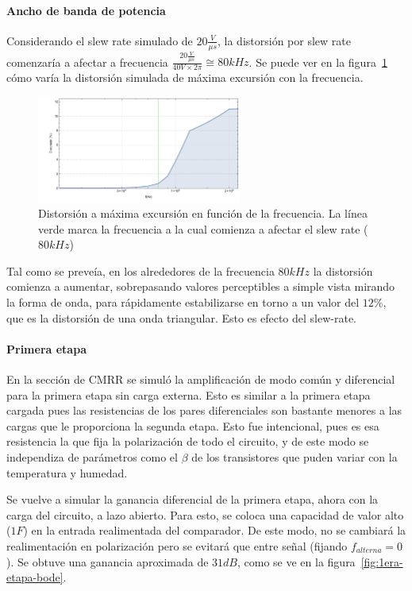 \documentclass[a4paper,12pt,twoside]{article}
\begin{document}
\paragraph{Ancho de banda de potencia}

Considerando el slew rate simulado de $20\frac{V}{\mu s}$, la distorsión por slew rate comenzaría a afectar a frecuencia $\frac{20\frac{V}{\mu s}}{40V \times 2\pi}\cong 80kHz$. Se puede ver en la figura~\ref{fig:distorsion-frec} cómo varía la distorsión simulada de máxima excursión con la frecuencia.


\begin{figure}[H]
	\centering
	\includegraphics[width=0.6\textwidth]{img/sim/distorsion-frec}
	\caption{Distorsión a máxima excursión en función de la frecuencia. La línea verde marca la frecuencia a la cual comienza a afectar el slew rate ($80kHz$)}
	\label{fig:distorsion-frec}
\end{figure}

Tal como se preveía, en los alrededores de la frecuencia $80kHz$ la distorsión comienza a aumentar, sobrepasando valores perceptibles a simple vista mirando la forma de onda, para rápidamente estabilizarse en torno a un valor del $12\%$, que es la distorsión de una onda triangular. Esto es efecto del slew-rate.


\paragraph{Primera etapa}

En la sección de CMRR se simuló la amplificación de modo común y diferencial para la primera etapa sin carga externa. Esto es similar a la primera etapa cargada pues las resistencias de los pares diferenciales son bastante menores a las cargas que le proporciona la segunda etapa. Esto fue intencional, pues es esa resistencia la que fija la polarización de todo el circuito, y de este modo se independiza de parámetros como el $\beta$ de los transistores que puden variar con la temperatura y humedad.

Se vuelve a simular la ganancia diferencial de la primera etapa, ahora con la carga del circuito, a lazo abierto. Para esto, se coloca una capacidad de valor alto ($1F$) en la entrada realimentada del comparador. De este modo, no se cambiará la realimentación en polarización pero se evitará que entre señal (fijando $f_{alterna}=0$). Se obtuve una ganancia aproximada de $31dB$, como se ve en la figura~\ref{fig:1era-etapa-bode}.
\end{document}
